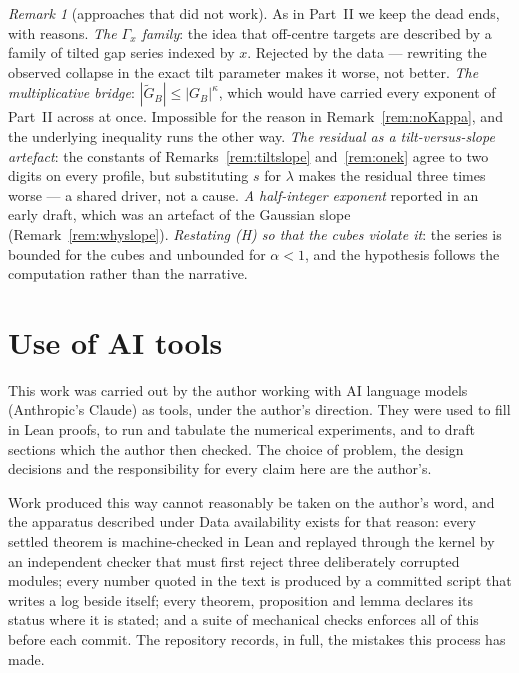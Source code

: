 \documentclass[11pt,a4paper]{article}
\theoremstyle{plain}
\theoremstyle{definition}
\theoremstyle{remark}
\newtheorem{remark}[theorem]{Remark}
\begin{document}
\begin{remark}[approaches that did not work]\label{rem:graveyard}
As in Part~II we keep the dead ends, with reasons. \emph{The $\Gamma_x$ family}: the idea that
off-centre targets are described by a family of tilted gap series indexed by $x$. Rejected by
the data --- rewriting the observed collapse in the exact tilt parameter makes it worse, not
better. \emph{The multiplicative bridge}: $|\widetilde G_B|\le|G_B|^{\kappa}$, which would have
carried every exponent of Part~II across at once. Impossible for the reason in
Remark~\ref{rem:noKappa}, and the underlying inequality runs the other way. \emph{The residual
as a tilt-versus-slope artefact}: the constants of Remarks~\ref{rem:tiltslope}
and~\ref{rem:onek} agree to two digits on every profile, but substituting $s$ for $\lambda$
makes the residual three times worse --- a shared driver, not a cause. \emph{A half-integer
exponent} reported in an early draft, which was an artefact of the Gaussian slope
(Remark~\ref{rem:whyslope}). \emph{Restating \textup{(H)} so that the cubes violate it}: the
series is bounded for the cubes and unbounded for $\alpha<1$, and the hypothesis follows the
computation rather than the narrative.
\end{remark}

\section*{Use of AI tools}
This work was carried out by the author working with AI language models
(Anthropic's Claude) as tools, under the author's direction. They were used to
fill in Lean proofs, to run and tabulate the numerical experiments, and to draft
sections which the author then checked. The choice of problem, the design
decisions and the responsibility for every claim here are the author's.

Work produced this way cannot reasonably be taken on the author's word, and the
apparatus described under Data availability exists for that reason: every settled
theorem is machine-checked in Lean and replayed through the kernel by an
independent checker that must first reject three deliberately corrupted modules;
every number quoted in the text is produced by a committed script that writes a
log beside itself; every theorem, proposition and lemma declares its status
where it is stated; and a suite of mechanical checks enforces all of this before
each commit. The repository records, in full, the mistakes this process has made.
\end{document}
